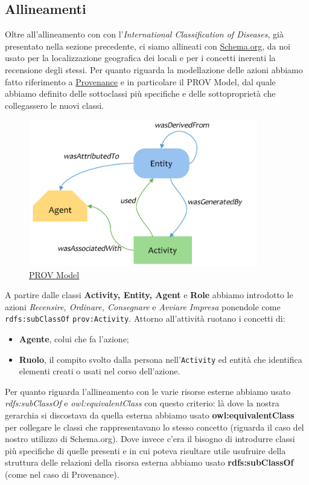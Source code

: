 \documentclass[12pt]{article}
\begin{document}
\subsection{Allineamenti}
Oltre all'allineamento con con l'\textit{International Classification of Diseases}, già presentato nella sezione precedente, ci siamo allineati con \href{https://schema.org/}{Schema.org}, da noi usato per la  localizzazione geografica dei locali e per i concetti inerenti la recensione degli stessi.\newline
Per quanto riguarda la modellazione delle azioni abbiamo fatto riferimento a \href{https://www.w3.org/TR/prov-o/}{Provenance} e in particolare il PROV Model, dal quale abbiamo definito delle sottoclassi più specifiche e delle sottoproprietà che collegassero le nuovi classi.
\begin{figure}[H]
    \centering
    \includegraphics[width=10cm]{files/provenacePattern.png}
    \caption{\href{https://en.wikipedia.org/wiki/PROV_(Provenance)}{PROV Model}}
\end{figure}
A partire dalle classi \textbf{Activity, Entity, Agent} e \textbf{Role} abbiamo introdotto le azioni \textit{Recensire, Ordinare, Consegnare} e \textit{Avviare Impresa} ponendole come \texttt{rdfs:subClassOf} \texttt{prov:Activity}. Attorno all'attività ruotano i concetti di:
\begin{itemize}
    \item \textbf{Agente}, colui che fa l'azione;
    \item \textbf{Ruolo}, il compito svolto dalla persona nell'\texttt{Activity} ed entità che identifica elementi creati o usati nel corso dell'azione.
\end{itemize}

Per quanto riguarda l'allineamento con le varie risorse esterne abbiamo usato \textit{rdfs:subClassOf} e \textit{owl:equivalentClass} con questo criterio: là dove la nostra gerarchia si discostava da quella esterna abbiamo usato \textbf{owl:equivalentClass} per collegare le classi che rappresentavano lo stesso concetto (riguarda il caso del nostro utilizzo di Schema.org).
\newline
Dove invece c'era il bisogno di introdurre classi più specifiche di quelle presenti e in cui poteva risultare utile usufruire della struttura delle relazioni della risorsa esterna abbiamo usato \textbf{rdfs:subClassOf} (come nel caso di Provenance).
\end{document}
